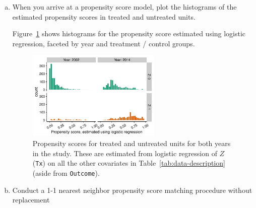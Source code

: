 \begin{enumerate}[(a)]
\item
  \begin{quoting}
    When you arrive at a propensity score model, plot the histograms
    of the estimated propensity scores in treated and untreated units.
  \end{quoting}
  Figure~\ref{fig:propensity-logistic} shows histograms for the
  propensity score estimated using logistic regression, faceted by
  year and treatment / control groups.  
  \begin{figure}[ht]
    \centering
    \includegraphics[width=0.6\textwidth]{figures/prop-count-logistic.pdf}
    \caption{\label{fig:propensity-logistic} Propensity scores for
      treated and untreated units for both years in the study.  These
      are estimated from logistic regression of $Z$ (\texttt{Tx}) on
      all the other covariates in Table~\ref{tab:data-description}
      (aside from \texttt{Outcome}).  %
    }
  \end{figure}
\item
  \begin{quoting}
    Conduct a 1-1 nearest neighbor propensity score matching procedure
    without replacement
  \end{quoting}

\end{enumerate}
